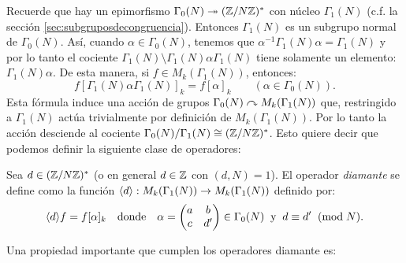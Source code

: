 \documentclass[../../tesis_maestria]{subfiles}
\begin{document}
Recuerde que hay un epimorfismo $\Gamma_0(N)\twoheadrightarrow(\mathbb{Z}/N\mathbb{Z})^*$ con n\'ucleo $\Gamma_1(N)$
(c.f. la secci\'on \ref{sec:subgruposdecongruencia}). Entonces $\Gamma_1(N)$ es un subgrupo normal
de $\Gamma_0(N)$. As\'i, cuando $\alpha\in\Gamma_0(N)$, tenemos que
$\alpha^{-1}\Gamma_1(N)\alpha=\Gamma_1(N)$ y por lo tanto el cociente
$\Gamma_1(N)\setminus\Gamma_1(N)\alpha\Gamma_1(N)$ tiene solamente un elemento: $\Gamma_1(N)\alpha$.
De esta manera, si $f\in M_k(\Gamma_1(N))$, entonces:
\[
  f[\Gamma_1(N)\alpha\Gamma_1(N)]_k=f[\alpha]_k\qquad(\alpha\in\Gamma_0(N)).
\]
Esta f\'ormula induce una acci\'on de grupos $\Gamma_0(N)\curvearrowright M_k(\Gamma_1(N))$ que, restringido
a $\Gamma_1(N)$ act\'ua trivialmente por definici\'on de $M_k(\Gamma_1(N))$. Por lo tanto la
acci\'on desciende al cociente $\Gamma_0(N)/\Gamma_1(N)\cong(\mathbb{Z}/N\mathbb{Z})^*$. Esto quiere decir que
podemos definir la siguiente clase de operadores:

\begin{defin}
  Sea $d\in(\mathbb{Z}/N\mathbb{Z})^*$ (o en general $d\in\mathbb{Z}$ con $(d,N)=1$). El operador \emph{diamante} se
  define como la funci\'on $\langle d \rangle:M_k(\Gamma_1(N))\rightarrow M_k(\Gamma_1(N))$ definido por:
  \[
    \langle d \rangle f=f[\alpha]_k\quad\text{donde}\quad
    \alpha=\begin{pmatrix}a & b\\ c & d'\end{pmatrix}\in\Gamma_0(N)\;\;\text{y}\;\; d\equiv d'\;\;(\mathrm{mod}\; N).
  \]
\end{defin}

Una propiedad importante que cumplen los operadores diamante es:
\end{document}
